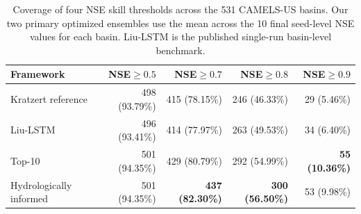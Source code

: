 \begin{table}[htbp]
\centering
\caption{Coverage of four NSE skill thresholds across the 531 CAMELS-US basins. Our two primary optimized ensembles use the mean across the 10 final seed-level NSE values for each basin. Liu-LSTM is the published single-run basin-level benchmark.}
\label{tab:threshold_coverage}
\small
\renewcommand{\arraystretch}{1.14}
\begin{tabular}{lrrrr}
\toprule
Framework & NSE$\geq0.5$ & NSE$\geq0.7$ & NSE$\geq0.8$ & NSE$\geq0.9$ \\
\midrule
Kratzert reference & 498 (93.79\%) & 415 (78.15\%) & 246 (46.33\%) & 29 (5.46\%) \\
Liu-LSTM & 496 (93.41\%) & 414 (77.97\%) & 263 (49.53\%) & 34 (6.40\%) \\
Top-10 & 501 (94.35\%) & 429 (80.79\%) & 292 (54.99\%) & \textbf{55 (10.36\%)} \\
Hydrologically informed & 501 (94.35\%) & \textbf{437 (82.30\%)} & \textbf{300 (56.50\%)} & 53 (9.98\%) \\
\bottomrule
\end{tabular}
\end{table}


